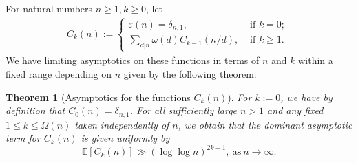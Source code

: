 \documentclass[11pt,reqno,a4letter]{article}
\numberwithin{figure}{section}
\numberwithin{table}{section}
\theoremstyle{plain}
\newtheorem{theorem}{Theorem}
\numberwithin{theorem}{section}
\theoremstyle{definition}
\newtheorem{remark}[theorem]{Remark}
\begin{document}

For natural numbers $n \geq 1, k \geq 0$, let 
\begin{align*} 
C_k(n) := \begin{cases} 
     \varepsilon(n) = \delta_{n,1}, & \text{ if $k = 0$; } \\ 
     \sum\limits_{d|n} \omega(d) C_{k-1}(n/d), & \text{ if $k \geq 1$. } 
     \end{cases} 
\end{align*} 
We have limiting asymptotics on these functions in terms of $n$ and $k$ within a fixed range 
depending on $n$ given by the following theorem: 

\begin{theorem}[Asymptotics for the functions $C_k(n)$] 
\label{theorem_Ckn_GeneralAsymptoticsForms} 
For $k := 0$, we have by definition that $C_0(n) = \delta_{n,1}$. 
For all sufficiently large $n > 1$ and any fixed $1 \leq k \leq \Omega(n)$ 
taken independently of $n$, 
we obtain that the dominant asymptotic term for $C_k(n)$ is given uniformly by 
\[
\mathbb{E}[C_k(n)] \gg (\log\log n)^{2k-1}, \mathrm{\ as\ }n \rightarrow \infty. 
\]
\end{theorem} 
\end{document}
